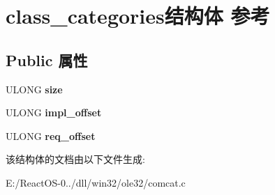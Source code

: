 \hypertarget{structclass__categories}{}\section{class\+\_\+categories结构体 参考}
\label{structclass__categories}
\subsection*{Public 属性}
\begin{DoxyCompactItemize}
\item 
\mbox{\label{structclass__categories_a2e8487614850b515039fc7f5a3be2e3e}} 
U\+L\+O\+NG {\bfseries size}
\item 
\mbox{\label{structclass__categories_a38ebd3989cc7d0fda151b8134ff994cb}} 
U\+L\+O\+NG {\bfseries impl\+\_\+offset}
\item 
\mbox{\label{structclass__categories_abaeb5287b6c3a437c96dadad19003ab0}} 
U\+L\+O\+NG {\bfseries req\+\_\+offset}
\end{DoxyCompactItemize}


该结构体的文档由以下文件生成\+:\begin{DoxyCompactItemize}
\item 
E\+:/\+React\+O\+S-\/0../dll/win32/ole32/comcat.\+c\end{DoxyCompactItemize}
